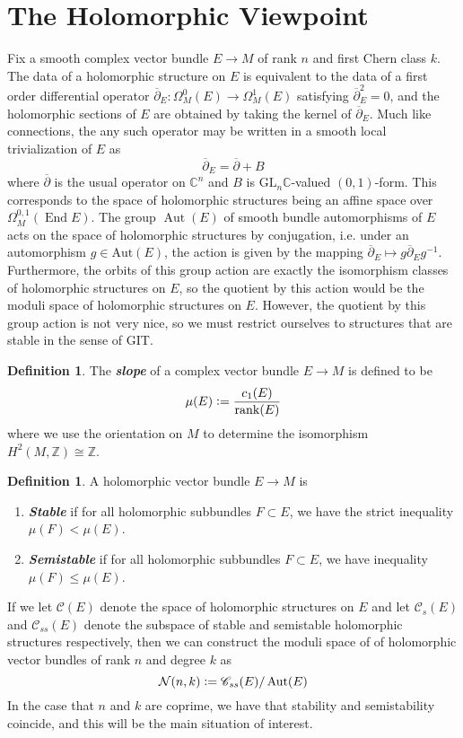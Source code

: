 \documentclass[psamsfonts, 12pt]{amsart}
\theoremstyle{definition}
\newtheorem{defn}[thm]{Definition}
\theoremstyle{remark}
\newcommand{\ib}[1]{\textbf{\textit{#1}}}
\newcommand{\Z}{\mathbb{Z}}
\newcommand{\C}{\mathbb{C}}
\newcommand{\dbar}{\overline{\partial}}
\newcommand{\GL}{\mathrm{GL}}
\newcommand{\inv}{^{-1}}
\newcommand{\defeq}{\vcentcolon=}
\DeclareMathOperator{\Aut}{Aut}
\DeclareMathOperator{\End}{End}
\begin{document}
\section{The Holomorphic Viewpoint}
%
Fix a smooth complex vector bundle $E \to M$ of rank $n$ and first Chern class $k$.
The data of a holomorphic structure on $E$ is equivalent to the data of a first
order differential operator $\dbar_E : \Omega^0_M(E) \to \Omega^1_M(E)$ satisfying
$\dbar_E^2 = 0$, and the holomorphic sections of $E$ are obtained by taking the
kernel of $\dbar_E$. Much like connections, the any such operator may be written in
a smooth local trivialization of $E$ as
\[
\dbar_E = \dbar + B
\]
where $\dbar$ is the usual operator on $\C^n$ and $B$ is $\GL_n\C$-valued
$(0,1)$-form. This corresponds to the space of holomorphic structures being an
affine space over $\Omega_M^{0,1}(\End E)$. The group $\Aut(E)$ of smooth bundle
automorphisms of $E$ acts on the space of holomorphic structures by conjugation, i.e.
under an automorphism $g \in \mathrm{Aut}(E)$, the action is given by the mapping
$\dbar_E \mapsto g\dbar_E g\inv$. Furthermore, the orbits of this group action are
exactly the isomorphism classes of holomorphic structures on $E$, so the quotient by
this action would be the moduli space of holomorphic structures on $E$. However,
the quotient by this group action is not very nice, so we must restrict ourselves to
structures that are stable in the sense of GIT.
%
\begin{defn}
The \ib{slope} of a complex vector bundle $E \to M$ is defined to be
\[
\mu(E) \defeq \frac{c_1(E)}{\mathrm{rank}(E)}
\]
where we use the orientation on $M$ to determine the isomorphism $H^2(M,\Z) \cong \Z$.
\end{defn}
%
\begin{defn}
A holomorphic vector bundle $E \to M$ is
\begin{enumerate}
  \item \ib{Stable} if for all holomorphic subbundles $F \subset E$, we have the
  strict inequality $\mu(F) < \mu(E)$.
  \item \ib{Semistable} if for all holomorphic subbundles $F \subset E$, we have
  inequality $\mu(F) \leq \mu(E)$.
\end{enumerate}
\end{defn}
%
If we let $\mathscr{C}(E)$ denote the space of holomorphic structures on $E$ and let
$\mathscr{C}_s(E)$ and $\mathscr{C}_{ss}(E)$ denote the subspace of stable and
semistable holomorphic structures respectively, then we can construct the moduli space
of of holomorphic vector bundles of rank $n$ and degree $k$ as
\[
\mathcal{N}(n,k) \defeq \mathscr{C}_{ss}(E)/\Aut(E)
\]
In the case that $n$ and $k$ are coprime, we have that stability and semistability
coincide, and this will be the main situation of interest. \\
\end{document}
